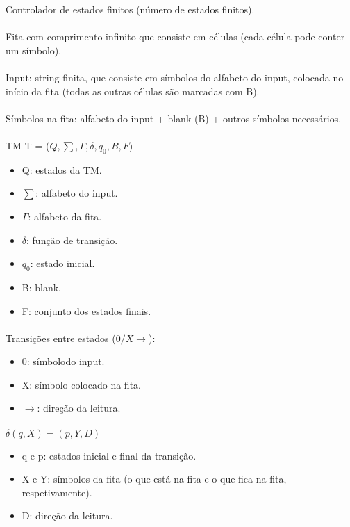 \documentclass[../resumosTCOM.tex]{subfiles}
\begin{document}
 

Controlador de estados finitos (número de estados finitos).

\paragraph{}

Fita com comprimento infinito que consiste em células (cada célula pode conter um símbolo).

\paragraph{}

Input: string finita, que consiste em símbolos do alfabeto do input, colocada no início da fita (todas as outras células são marcadas com B).

\paragraph{}

Símbolos na fita: alfabeto do input + blank (B) + outros símbolos necessários.

\paragraph{}

TM T = (\(Q, \sum, \Gamma, \delta, q_0, B, F\))
\begin{itemize}
    \item Q: estados da TM.
    \item $\sum$: alfabeto do input.
    \item $\Gamma$: alfabeto da fita.
    \item $\delta$: função de transição.
    \item $q_0$: estado inicial.
    \item B: blank.
    \item F: conjunto dos estados finais.
\end{itemize}

\paragraph{}

Transições entre estados ($0/X \rightarrow$):
\begin{itemize}
    \item 0: símbolodo input.
    \item X: símbolo colocado na fita.
    \item $\rightarrow$: direção da leitura.
\end{itemize}

\paragraph{}

$\delta(q, X) = (p, Y, D)$
\begin{itemize}
    \item q e p: estados inicial e final da transição.
    \item X e Y: símbolos da fita (o que está na fita e o que fica na fita, respetivamente).
    \item D: direção da leitura.
\end{itemize}
\end{document}
